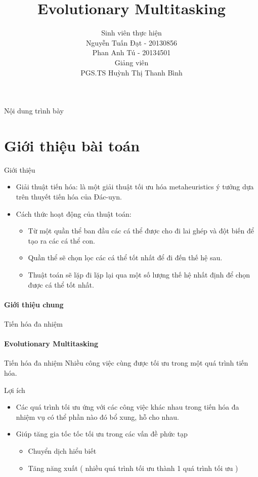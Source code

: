 \documentclass[compress]{beamer}
\title[Evolutionary Multitasking]{Evolutionary Multitasking}
\author[Nguyễn Tuấn Đạt, Phan Anh Tú (SoICT-HUST)]{
Sinh viên thực hiện\\
Nguyễn Tuấn Đạt - 20130856 \\
Phan Anh Tú - 20134501 \\[0.4cm]
Giảng viên \\
PGS.TS Huỳnh Thị Thanh Bình
}
\begin{document}
\begin{frame}
\titlepage
\end{frame}

\begin{frame}{Nội dung trình bày}
\tableofcontents
\end{frame}

\section{Giới thiệu bài toán}

\begin{frame}{Giới thiệu}
\begin{itemize}
\item Giải thuật tiến hóa: là một giải thuật tối ưu hóa metaheuristics ý tưởng dựa trên thuyết tiến hóa của Đác-uyn.
\pause
\item Cách thức hoạt động của thuật toán:
\pause
\begin{itemize}
\item Từ một quần thể ban đầu các cá thể được cho đi lai ghép và đột biến để tạo ra các cá thể con.
\item Quần thể sẽ chọn lọc các cá thể tốt nhất để đi đến thế hệ sau.
\item Thuật toán sẽ lặp đi lặp lại qua một số lượng thế hệ nhất định để chọn được cá thể tốt nhất.
\end{itemize}
\end{itemize}
\framesubtitle{Giới thiệu chung}
\end{frame}
\begin{frame}{Tiến hóa đa nhiệm}
\framesubtitle{Evolutionary Multitasking}
\begin{block}{Tiến hóa đa nhiệm}
Nhiều công việc cùng được tối ưu trong một quá trình tiến hóa.
\end{block}
\pause
\begin{block}{Lợi ích}
\begin{itemize}
\item Các quá trình tối ưu ứng với các công việc khác nhau trong tiến hóa đa nhiệm vụ có thể phần nào đó bổ xung, hỗ cho nhau.
\item Giúp tăng gia tốc tốc tối ưu trong các vấn đề phức tạp
\begin{itemize}
\item Chuyển dịch hiểu biết
\item Tăng năng xuất ( nhiều quá trình tối ưu thành 1 quá trình tối ưu )
\end{itemize}
\end{itemize}
\end{block}

\end{frame}
\end{document}
